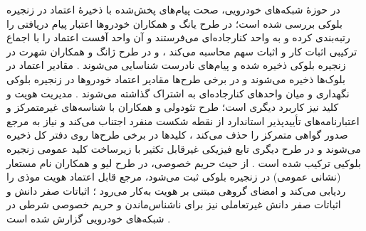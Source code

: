 \documentclass[12pt,a4paper]{article}
\begin{document}
در حوزهٔ شبکه‌های خودرویی، صحت پیام‌های پخش‌شده با ذخیرهٔ اعتماد در زنجیره بلوکی بررسی شده است؛ در طرح یانگ و همکاران خودرو‌ها اعتبار پیام دریافتی را رتبه‌بندی کرده و به واحد کنارجاده‌ای می‌فرستند و آن واحد آفست اعتماد را با اجماع ترکیبی اثبات کار و اثبات سهم محاسبه می‌کند \cite{razaBlockchainBasedReputationTrust2024}، و در طرح ژانگ و همکاران شهرت در زنجیره بلوکی ذخیره شده و پیام‌های نادرست شناسایی می‌شوند \cite{razaBlockchainBasedReputationTrust2024}. مقادیر اعتماد در بلوک‌ها ذخیره می‌شوند \cite{razaBlockchainBasedReputationTrust2024} و در برخی طرح‌ها مقادیر اعتماد خودرو‌ها در زنجیره بلوکی نگهداری و میان واحد‌های کنارجاده‌ای به اشتراک گذاشته می‌شوند \cite{farsimadanReviewSecurityChallenges2025}. مدیریت هویت و کلید نیز کاربرد دیگری است؛ طرح تئودولی و همکاران با شناسه‌های غیرمتمرکز و اعتبارنامه‌های تأییدپذیر استاندارد  از نقطه شکست منفرد اجتناب می‌کند و نیاز به مرجع صدور گواهی متمرکز را حذف می‌کند \cite{razaBlockchainBasedReputationTrust2024}، کلید‌ها در برخی طرح‌ها روی دفتر کل ذخیره می‌شوند \cite{razaBlockchainBasedReputationTrust2024} و در طرح دیگری تابع فیزیکی غیرقابل تکثیر با زیرساخت کلید عمومی زنجیره بلوکیی ترکیب شده است \cite{razaBlockchainBasedReputationTrust2024}. از حیث حریم خصوصی، در طرح لیو و همکاران نام مستعار (نشانی عمومی) در زنجیره بلوکی ثبت می‌شود، مرجع قابل اعتماد هویت موذی را ردیابی می‌کند و امضای گروهی مبتنی بر هویت به‌کار می‌رود \cite{razaBlockchainBasedReputationTrust2024}؛ اثباتات صفر دانش و اثباتات صفر دانش غیرتعاملی نیز برای ناشناس‌ماندن و حریم خصوصی شرطی در شبکه‌های خودرویی گزارش شده است \cite{razaBlockchainBasedReputationTrust2024}.
\end{document}
